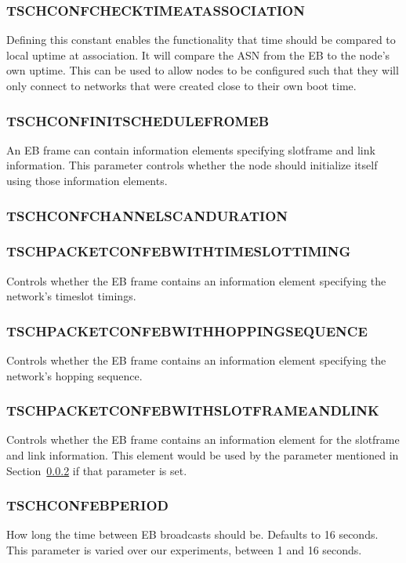 \documentclass[conference]{IEEEtran}
\newcommand{\secref}[1]{Section~\ref{#1}}
\renewcommand\_{\textunderscore\allowbreak}
\begin{document}
\subsubsection{TSCH\_CONF\_CHECK\_TIME\_AT\_ASSOCIATION}
Defining this constant enables the functionality that time should be compared to local uptime at association. It will compare the ASN from the EB to the node's own uptime. This can be used to allow nodes to be configured such that they will only connect to networks that were created close to their own boot time. 

\subsubsection{TSCH\_CONF\_INIT\_SCHEDULE\_FROM\_EB} 
\label{t2_initsched}
An EB frame can contain information elements specifying slotframe and link information. This parameter controls whether the node should initialize itself using those information elements.

\subsubsection{TSCH\_CONF\_CHANNEL\_SCAN\_DURATION}

\subsubsection{TSCH\_PACKET\_CONF\_EB\_WITH\_TIMESLOT\_TIMING}
Controls whether the EB frame contains an information element specifying the network's timeslot timings.

\subsubsection{TSCH\_PACKET\_CONF\_EB\_WITH\_HOPPING\_SEQUENCE} 
Controls whether the EB frame contains an information element specifying the network's hopping sequence.

\subsubsection{TSCH\_PACKET\_CONF\_EB\_WITH\_SLOTFRAME\_AND\_LINK}

Controls whether the EB frame contains an information element for the slotframe and link information. This element would be used by the parameter mentioned in \secref{t2_initsched} if that parameter is set.

\subsubsection{TSCH\_CONF\_EB\_PERIOD}
How long the time between EB broadcasts should be. Defaults to 16 seconds. This parameter is varied over our experiments, between 1 and 16 seconds. 
\end{document}
